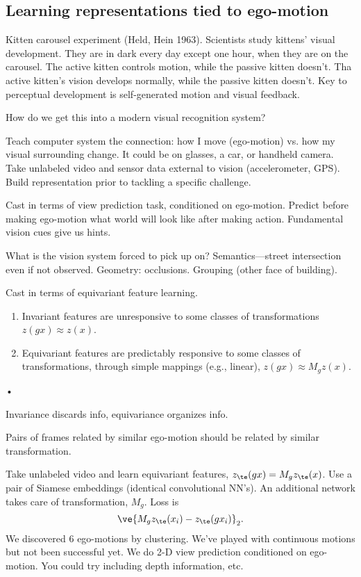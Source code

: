 \subsection{Learning representations tied to ego-motion}

Kitten carousel experiment (Held, Hein 1963). Scientists study kittens' visual development. They are in dark every day except one hour, when they are on the carousel. The active kitten controls motion, while the passive kitten doesn't. Tha active kitten's vision develops normally, while the passive kitten doesn't. Key to perceptual development is self-generated motion and visual feedback.

How do we get this into a modern visual recognition system? 

Teach computer system the connection: how I move (ego-motion) vs. how my visual surrounding change. 
It could be on glasses, a car, or handheld camera. Take unlabeled video and sensor data external to vision (accelerometer, GPS). Build representation prior to tackling a specific challenge.

Cast in terms of view prediction task, conditioned on ego-motion. Predict before making ego-motion what world will look like after making action.
Fundamental vision cues give us hints.

What is the vision system forced to pick up on? Semantics---street intersection even if not observed. Geometry: occlusions. Grouping (other face of building).

Cast in terms of equivariant feature learning. 
\begin{enumerate}
\item
Invariant features are unresponsive to some classes of transformations $z(gx)\approx z(x)$. 
\item
Equivariant features are predictably responsive to some classes of transformations, through simple mappings (e.g., linear), $z(gx)\approx M_g z(x)$. 
\end{enumerate}•

Invariance discards info, equivariance organizes info.

Pairs of frames related by similar ego-motion should be related by similar transformation. 

Take unlabeled video and learn equivariant features, $z_\te(gx)=M_gz_\te(x)$. Use a pair of Siamese embeddings (identical convolutional NN's). An additional network takes care of transformation, $M_g$. Loss is
$$
\ve{M_g z_\te(x_i) - z_\te(gx_i)}_2.
$$
We discovered 6 ego-motions by clustering. We've played with continuous motions but not been successful yet.
We do 2-D view prediction conditioned on ego-motion. You could try including depth information, etc.

